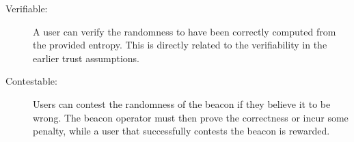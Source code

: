 \begin{description}
    \item[Verifiable:]
        A user can verify the randomness to have been correctly computed from the provided entropy.
        This is directly related to the verifiability in the earlier trust assumptions.

    \item[Contestable:]
        Users can contest the randomness of the beacon if they believe it to be wrong.
        The beacon operator must then prove the correctness or incur some penalty, while a user that successfully contests the beacon is rewarded. 
\end{description}

